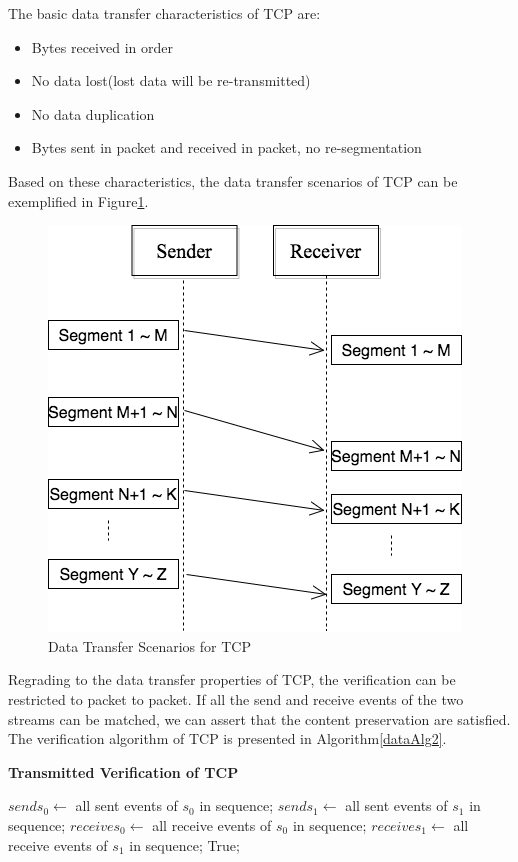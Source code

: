 The basic data transfer characteristics of TCP are:
\begin{itemize}
  \item Bytes received in order
  \item No data lost(lost data will be re-transmitted)
  \item No data duplication
  \item Bytes sent in packet and received in packet, no re-segmentation
\end{itemize}

Based on these characteristics,  the data transfer scenarios of TCP can be exemplified in Figure\ref{tcp}.
\begin{figure}[H]
\centerline{\includegraphics[scale=0.4]{Figures/tcp}}
 \caption{Data Transfer Scenarios for TCP}
\label{tcp}
\end{figure}

Regrading to the data transfer properties of TCP, the verification can be restricted to packet to packet. If all the send and receive events of the two streams can be matched, we can assert that the content preservation are satisfied. The verification algorithm of TCP is presented in Algorithm\ref{dataAlg2}.

\begin{algorithm}[H]
\DontPrintSemicolon
\caption{{\bf Transmitted Verification of TCP} \label{dataAlg2}}
\;
$sends_0 \leftarrow$ all sent events of $s_0$ in sequence;\;
$sends_1 \leftarrow$ all sent events of $s_1$ in sequence;\;
$receives_0 \leftarrow$ all receive events of $s_0$ in sequence;\;
$receives_1 \leftarrow$ all receive events of $s_1$ in sequence;\;
 \KwRet True;\;
\end{algorithm} 




